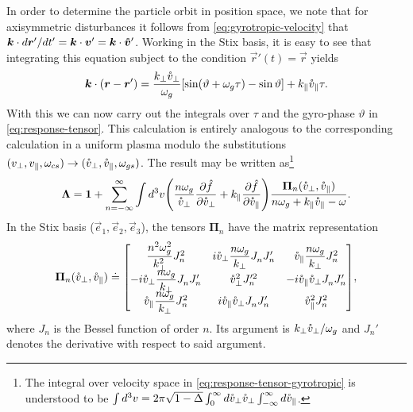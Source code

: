 \documentclass[aps,pre,notitlepage,amsmath,amssymb,amsfonts,nobibnotes,nofootinbib]{revtex4-1}
\begin{document}
In order to determine the particle orbit in position space, we note that for
axisymmetric disturbances it follows from \cref{eq:gyrotropic-velocity} that
$\bm{k}\cdot{}d\bm{r}'/dt'=\bm{k}\cdot\bm{v}'=\bm{k}\cdot\bm{\mathring{v}}'$. Working
in the Stix basis, it is easy to see that integrating this equation subject to
the condition $\vec{r}'(t)=\vec{r}$ yields
\begin{equation}
  \label{eq:k-dot-r}
  \vec{k}\cdot(\vec{r}-\vec{r}')
  = \frac{k_\perp\vc_\perp}{\omg}
  [\sin(\vartheta + \omg\tau) - \sin\vartheta]
  + k_\parallel\vc_\parallel\tau.
\end{equation}
With this we can now carry out the integrals over $\tau$ and the gyro-phase
$\vartheta$ in \cref{eq:response-tensor}. This calculation is entirely
analogous to the corresponding calculation in a uniform plasma \citep[see
e.g.][]{Ichimaru1973} modulo the substitutions
$(v_\perp,v_\parallel,\omega_{cs})\to(\mathring{v}_\perp,\mathring{v}_\parallel,\omega_{gs})$. The result
may be written as\footnote{The integral over velocity space in
  \cref{eq:response-tensor-gyrotropic} is understood to be
  $\int{}d^3v=2\pi\sqrt{1-\Delta}
  \int_0^\infty{}d\mathring{v}_\perp\mathring{v}_\perp\int_{-\infty}^\infty{}d\mathring{v}_\parallel$.}
\begin{equation}
  \label{eq:response-tensor-gyrotropic}
  \mathbf{\Lambda} =
  \mathbf{1} + \sum_{n=-\infty}^\infty\int d^3v\left(
    \frac{n\omg}{\vc_\perp}\pder{\hat{f}}{\vc_\perp}
    + k_\parallel\pder{\hat{f}}{\vc_\parallel}
  \right)
  \frac{\mathbf{\Pi}_n(\vc_\perp,\vc_\parallel)}
  {n\omg + k_\parallel\vc_\parallel - \omega}.
\end{equation}
In the Stix basis ($\vec{e}_1,\vec{e}_2,\vec{e}_3$), the tensors
$\mathbf{\Pi}_n$ have the matrix representation
\begingroup
\renewcommand*{\arraystretch}{2}
\begin{equation}
  \label{eq:Pi-tensor}
  \mathbf{\Pi}_n(\vc_\perp,\vc_\parallel) \doteq \left[\begin{matrix}
      \dfrac{n^2\omg^2}{k_\perp^2} J_n^2 &
      i\vc_\perp\dfrac{n\omg}{k_\perp} J^{}_n J_n' &
      \vc_\parallel\dfrac{n\omg}{k_\perp} J_n^2 \\
      -i\vc_\perp\dfrac{n\omg}{k_\perp} J^{}_n J_n' &
      \vc_\perp^2 J_n'^2 &
      -i\vc_\parallel\vc_\perp J^{}_n J_n' \\
      \vc_\parallel\dfrac{n\omg}{k_\perp} J_n^2 &
      i\vc_\parallel\vc_\perp J^{}_n J_n' &
      \vc_\parallel^2 J_n^2
  \end{matrix}\right],
\end{equation}
\endgroup
where $J_n$ is the Bessel function of order $n$. Its argument is
$k_\perp\mathring{v}_\perp/\omega_g$ and $J_n'$ denotes the derivative with respect to said
argument.
\end{document}
